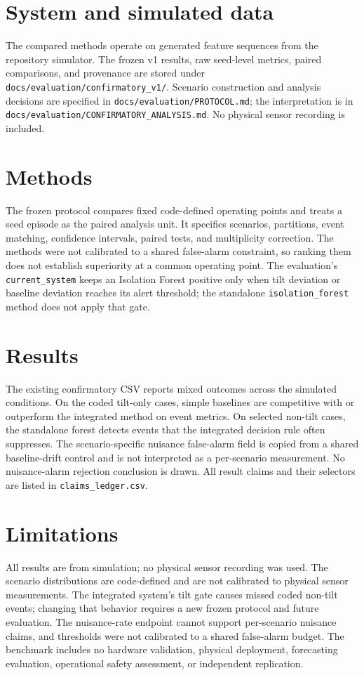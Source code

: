 \documentclass[11pt]{article}
\begin{document}
\section{System and simulated data}
The compared methods operate on generated feature sequences from the repository
simulator. The frozen v1 results, raw seed-level metrics, paired comparisons,
and provenance are stored under
\texttt{docs/evaluation/confirmatory\_v1/}. Scenario construction and analysis
decisions are specified in \texttt{docs/evaluation/PROTOCOL.md}; the
interpretation is in \texttt{docs/evaluation/CONFIRMATORY\_ANALYSIS.md}.
No physical sensor recording is included.

\section{Methods}
The frozen protocol compares fixed code-defined operating points and treats a
seed episode as the paired analysis unit. It specifies scenarios, partitions,
event matching, confidence intervals, paired tests, and multiplicity
correction. The methods were not calibrated to a shared false-alarm constraint,
so ranking them does not establish superiority at a common operating point.
The evaluation's \texttt{current\_system} keeps an Isolation Forest positive
only when tilt deviation or baseline deviation reaches its alert threshold;
the standalone \texttt{isolation\_forest} method does not apply that gate.

\section{Results}
The existing confirmatory CSV reports mixed outcomes across the simulated
conditions. On the coded tilt-only cases, simple baselines are competitive
with or outperform the integrated method on event metrics. On selected
non-tilt cases, the standalone forest detects events that the integrated
decision rule often suppresses. The scenario-specific nuisance false-alarm
field is copied from a shared baseline-drift control and is not interpreted as
a per-scenario measurement. No nuisance-alarm rejection conclusion is drawn.
All result claims and their selectors are listed in
\texttt{claims\_ledger.csv}.

\section{Limitations}
All results are from simulation; no physical sensor recording was used. The
scenario distributions are code-defined and are not calibrated to physical
sensor measurements. The integrated system's tilt gate causes missed coded
non-tilt events; changing that behavior requires a new frozen protocol and
future evaluation. The nuisance-rate endpoint cannot support per-scenario
nuisance claims, and thresholds were not calibrated to a shared false-alarm
budget. The benchmark includes no hardware validation, physical deployment,
forecasting evaluation, operational safety assessment, or independent
replication.
\end{document}
